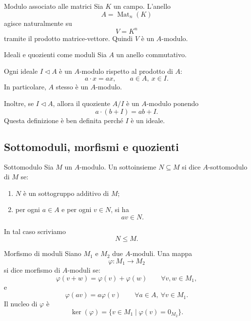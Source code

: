 \documentclass[a4paper]{article}
\begin{document}
\begin{radioactive}
\begin{snippetexample}{Modulo associato alle matrici}
    Sia \(K\) un campo. L'anello
    \[
        A=\operatorname{Mat}_n(K)
    \]
    agisce naturalmente su
    \[
        V=K^n
    \]
    tramite il prodotto matrice-vettore. Quindi \(V\) è un \(A\)-modulo.
\end{snippetexample}
\end{radioactive}

\begin{radioactive}
\begin{snippetexample}{Ideali e quozienti come moduli}
    Sia \(A\) un anello commutativo.

    Ogni ideale \(I\triangleleft A\) è un \(A\)-modulo rispetto al prodotto di \(A\):
    \[
        a\cdot x=ax,
        \qquad
        a\in A,\ x\in I.
    \]
    In particolare, \(A\) stesso è un \(A\)-modulo.

    Inoltre, se \(I\triangleleft A\), allora il quoziente \(A/I\) è un \(A\)-modulo ponendo
    \[
        a\cdot (b+I)=ab+I.
    \]
    Questa definizione è ben definita perché \(I\) è un ideale.
\end{snippetexample}
\end{radioactive}

\subsection{Sottomoduli, morfismi e quozienti}

\begin{radioactive}
\begin{snippetdefinition}{Sottomodulo}
    Sia \(M\) un \(A\)-modulo. Un sottoinsieme \(N\subseteq M\) si dice \(A\)-sottomodulo di \(M\) se:
    \begin{enumerate}
        \item \(N\) è un sottogruppo additivo di \(M\);
        \item per ogni \(a\in A\) e per ogni \(v\in N\), si ha
        \[
            av\in N.
        \]
    \end{enumerate}
    In tal caso scriviamo
    \[
        N\leq M.
    \]
\end{snippetdefinition}
\end{radioactive}

\begin{radioactive}
\begin{snippetdefinition}{Morfismo di moduli}
    Siano \(M_1\) e \(M_2\) due \(A\)-moduli. Una mappa
    \[
        \varphi\colon M_1\to M_2
    \]
    si dice morfismo di \(A\)-moduli se:
    \[
        \varphi(v+w)=\varphi(v)+\varphi(w)
        \qquad
        \forall v,w\in M_1,
    \]
    e
    \[
        \varphi(av)=a\varphi(v)
        \qquad
        \forall a\in A,\ \forall v\in M_1.
    \]
    Il nucleo di \(\varphi\) è
    \[
        \ker(\varphi)
        =
        \{v\in M_1\mid \varphi(v)=0_{M_2}\}.
    \]
\end{snippetdefinition}
\end{radioactive}
\end{document}
